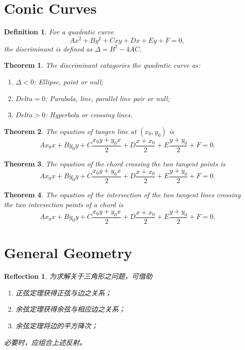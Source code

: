 \documentclass{ctexart}
\newtheorem{thm}{Theorem}
\newtheorem{defn}{Definition}
\newtheorem{refl}{Reflection}
\newcommand{\Quad}{Ax^2 + By^2 + Cxy + Dx +Ey + F = 0}
\begin{document}
\section{Conic Curves}
\begin{defn}
For a quadratic curve
\[ \Quad, \]
the discriminant is defined as $\Delta = B^2-4AC$.
\end{defn}
\begin{thm}
The discriminant catagories the quadratic curve as:
\begin{enumerate}
\item $\Delta<0$: Ellipse, point or null;
\item $Delta=0$: Parabola, line, parallel line pair or null;
\item $Delta>0$: Hyperbola or crossing lines.
\end{enumerate}
\end{thm}
\begin{thm}
The equation of tangen line at $(x_0, y_0)$ is
\[ Ax_0x + By_0y + C\frac{x_0 y + y_0 x}{2} + D\frac{x+x_0}{2} + E\frac{y+y_0}{2} + F=0. \]
\end{thm}
\begin{thm}
The equation of the chord crossing the two tangent points is
\[ Ax_0x + By_0y + C\frac{x_0 y + y_0 x}{2} + D\frac{x+x_0}{2} + E\frac{y+y_0}{2} + F=0. \]
\end{thm}
\begin{thm}
The equation of the intersection of the two tangent lines crossing the two intersection points of a chord is
\[ Ax_0x + By_0y + C\frac{x_0 y + y_0 x}{2} + D\frac{x+x_0}{2} + E\frac{y+y_0}{2} + F=0. \]
\end{thm}


\section{General Geometry}
\begin{refl}
为求解关于三角形之问题，可借助
\begin{enumerate}
\item 正弦定理获得正弦与边之关系；
\item 余弦定理获得余弦与相应边之关系；
\item 余弦定理将边的平方降次；
\end{enumerate}
必要时，应组合上述反射。
\end{refl}
\end{document}
